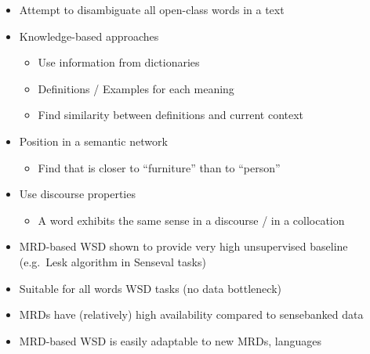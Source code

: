 \documentclass[a4paper,landscape,headrule,footrule,xetex]{foils}
\begin{document}
\begin{itemize}
\item Attempt to disambiguate all open-class words in a text
\\ 

\item Knowledge-based approaches
  \begin{itemize}
  \item Use information from dictionaries
  \item Definitions / Examples for each meaning
  \item Find similarity between definitions and current context
  \end{itemize}
\item   Position in a semantic network
  \begin{itemize}
  \item Find that  is closer to  ``furniture''
    than to  ``person''
  \end{itemize}
\item Use discourse properties
  \begin{itemize}
  \item A word exhibits the same sense in a discourse / in a collocation
  \end{itemize}
\end{itemize}




\begin{itemize}
\item MRD-based WSD shown to provide very high unsupervised baseline
  (e.g.\ Lesk algorithm in Senseval tasks)
\item Suitable for all words WSD tasks (no data bottleneck)
\item MRDs have (relatively) high availability compared to
  sensebanked data
\item MRD-based WSD is easily adaptable to new MRDs, languages
\end{itemize}


\end{document}
